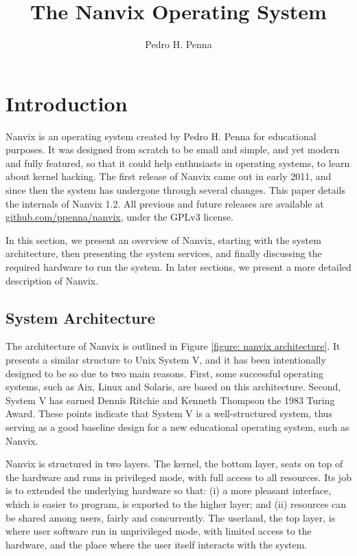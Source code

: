 \documentclass[10pt,a4paper]{article}
\author{Pedro H. Penna}
\title{The Nanvix Operating System}
\begin{document}
\maketitle

\section{Introduction}
\label{section: introduction}

Nanvix is an operating system created by Pedro H. Penna for educational purposes. It was designed from scratch to be small and simple, and yet modern and fully featured, so that it could help enthusiasts in operating systems, to learn about kernel hacking. The first release of Nanvix came out in early 2011, and since then the system has undergone through several changes. This paper details the internals of Nanvix 1.2. All previous and future releases are available at \url{github.com/ppenna/nanvix}, under the GPLv3 license.

In this section, we present an overview of Nanvix, starting with the system architecture, then presenting the system services, and finally discussing the required hardware to run the system. In later sections, we present a more detailed description of Nanvix.

\subsection{System Architecture}
\label{section: system architecture}

The architecture of Nanvix is outlined in Figure \ref{figure: nanvix architecture}. It presents a similar structure to Unix System V, and it has been intentionally designed to be so due to two main reasons. First, some successful operating systems, such as Aix, Linux and Solaris, are based on this architecture. Second, System V has earned Dennis Ritchie and Kenneth Thompson the 1983 Turing Award. These points indicate that System V is a well-structured system, thus serving as a good baseline design for a new educational operating system, such as Nanvix.

Nanvix is structured in two layers. The kernel, the bottom layer, seats on top of the hardware and runs in privileged mode, with full access to all resources. Its job is to extended the underlying hardware so that: (i) a more pleasant interface, which is easier to program, is exported to the higher layer; and (ii) resources can be shared among users, fairly and concurrently. The userland, the top layer, is where user software run in unprivileged mode, with limited access to the hardware, and the place where the user itself interacts with the system.
\end{document}
